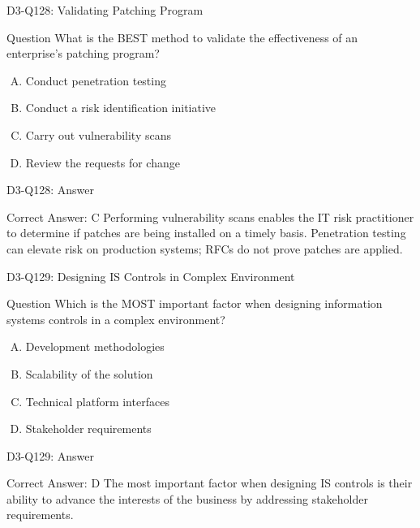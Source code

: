 \documentclass{beamer}
\begin{document}
	\begin{frame}{D3-Q128: Validating Patching Program}
		\begin{block}{Question}
			What is the BEST method to validate the effectiveness of an enterprise's patching program?
		\end{block}
		\begin{enumerate}[(A)]
			\item Conduct penetration testing
			\item Conduct a risk identification initiative
			\item Carry out vulnerability scans
			\item Review the requests for change
		\end{enumerate}
	\end{frame}
	\begin{frame}{D3-Q128: Answer}
		\begin{block}{Correct Answer: C}
			Performing vulnerability scans enables the IT risk practitioner to determine if patches are being installed on a timely basis. Penetration testing can elevate risk on production systems; RFCs do not prove patches are applied.
		\end{block}
	\end{frame}
	
	\begin{frame}{D3-Q129: Designing IS Controls in Complex Environment}
		\begin{block}{Question}
			Which is the MOST important factor when designing information systems controls in a complex environment?
		\end{block}
		\begin{enumerate}[(A)]
			\item Development methodologies
			\item Scalability of the solution
			\item Technical platform interfaces
			\item Stakeholder requirements
		\end{enumerate}
	\end{frame}
	\begin{frame}{D3-Q129: Answer}
		\begin{block}{Correct Answer: D}
			The most important factor when designing IS controls is their ability to advance the interests of the business by addressing stakeholder requirements.
		\end{block}
	\end{frame}
	
\end{document}
